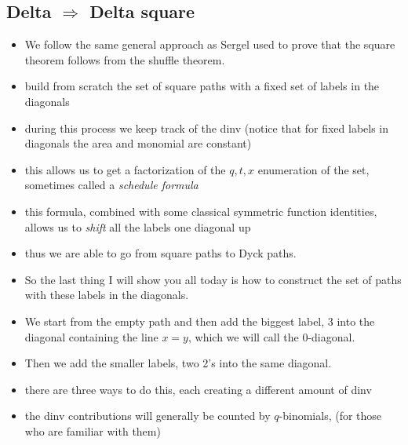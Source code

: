 \documentclass{article}
\begin{document}
    \subsection{Delta $\Rightarrow$ Delta square}
        \begin{itemize}
            \item We follow the same general approach as Sergel used to prove that the square theorem follows from the shuffle theorem.
            \item build from scratch the set of square paths with a fixed set of labels in the diagonals
            \item during this process we keep track of the dinv (notice that for fixed labels in diagonals the area and monomial are constant)
            \item this allows us to get a factorization of the $q,t,x$ enumeration of the set, sometimes called a \emph{schedule formula}
            \item this formula, combined with some classical symmetric function identities, allows us to \emph{shift} all the labels one diagonal up
            \item thus we are able to go from square paths to Dyck paths.
            \item So the last thing I will show you all today is how to construct the set of paths with these labels in the diagonals.
            \item We start from the empty path and then add the biggest label, 3 into the diagonal containing the line $x=y$, which we will call the $0$-diagonal. 
            \item Then we add the smaller labels, two 2's into the same diagonal.
            \item there are three ways to do this, each creating a different amount of dinv
            \item  the dinv contributions will generally be counted by $q$-binomials, (for those who are familiar with them)
        \end{itemize}
\end{document}

